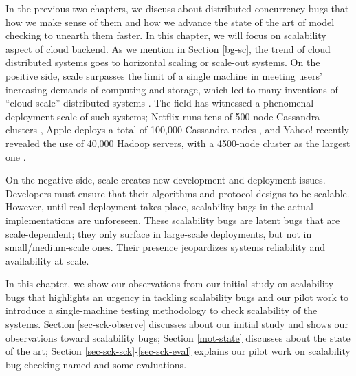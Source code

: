 
In the previous two chapters, we discuss about distributed concurrency bugs
that how we make sense of them and how we advance the state of the art of model
checking to unearth them faster. In this chapter, we will focus on
scalability aspect of cloud backend. As we mention in Section \ref{bg-sc}, the
trend of cloud distributed systems goes to horizontal scaling or scale-out systems.
On the positive side, scale surpasses the limit of a single machine in
meeting users' increasing demands of computing and storage, which led to
many inventions of ``cloud-scale'' distributed systems
\cite{Chang+06-BigTable, 
DeanGhemawat04-MapReduce, 
DeCandia+07-Dynamo,
Ghemawat+03-GoogleFS, 
Hindman+11-Mesos,
Verma+15-Borg}. The field has witnessed a
phenomenal deployment scale of such systems;
%
Netflix runs tens of 500-node Cassandra clusters \cite{RunningNetflix13},
Apple deploys a total of 100,000 Cassandra nodes \cite{WikiCassandra}, 
and Yahoo! recently revealed the use of 40,000 Hadoop servers,
with a 4500-node cluster as the largest one \cite{LargestHadoop}.

On the negative side, scale creates new development and deployment issues.
Developers must ensure that their algorithms and protocol designs to be
scalable.  However, until real deployment takes place, scalability bugs in the
actual implementations are unforeseen.
These scalability bugs are latent bugs that are scale-dependent; they only
surface in large-scale deployments, but not in small/medium-scale ones. Their
presence jeopardizes systems reliability and availability at scale.

In this chapter, we show our observations from our initial study on scalability
bugs that highlights an urgency in tackling scalability bugs and our pilot work
to introduce a single-machine testing methodology to check scalability of the
systems. Section \ref{sec-sck-observe} discusses about our initial study and shows our
observations toward scalability bugs; Section \ref{mot-state} discusses about the state
of the art; Section \ref{sec-sck-sck}-\ref{sec-sck-eval} explains our pilot work on scalability
bug checking named \sck and some evaluations.

